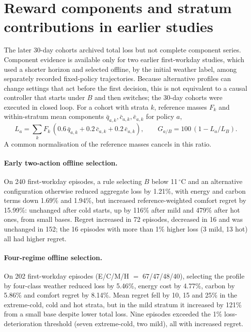 \section{Reward components and stratum contributions in earlier studies}\label{app:components}
The later 30-day cohorts archived total loss but not complete component series. Component evidence is available only for
two earlier first-workday studies, which used a shorter horizon and selected offline, by the initial weather label, among
separately recorded fixed-policy trajectories. Because alternative profiles can change settings that act before the first
decision, this is not equivalent to a causal controller that starts under $B$ and then switches; the 30-day cohorts were
executed in closed loop. For a cohort with strata $k$, reference masses $F_k$ and within-stratum mean components
$\bar q_{a,k}, \bar c_{a,k}, \bar e_{a,k}$ for policy $a$,
\begin{equation}
  L_{a} = \sum_k F_k\,(0.6\,\bar q_{a,k} + 0.2\,\bar c_{a,k} + 0.2\,\bar e_{a,k}),
  \qquad G_{a/B} = 100\,(1 - L_a/L_B).
\end{equation}
A common normalisation of the reference masses cancels in this ratio.

\paragraph{Early two-action offline selection.}
On 240 first-workday episodes, a rule selecting $B$ below 11\,$^\circ$C and an alternative configuration otherwise
reduced aggregate loss by 1.21\%, with energy and carbon terms down 1.69\% and 1.94\%, but increased reference-weighted
comfort regret by 15.99\%: unchanged after cold starts, up by 116\% after mild and 479\% after hot ones, from small bases. Regret increased in 72 episodes, decreased in 16 and was unchanged in 152;
the 16 episodes with more than 1\% higher loss (3 mild, 13 hot) all had higher regret.

\paragraph{Four-regime offline selection.}
On 202 first-workday episodes (E/C/M/H $=$ 67/47/48/40), selecting the profile by four-class weather reduced loss by
5.46\%, energy cost by 4.77\%, carbon by 5.86\% and comfort regret by 8.14\%. Mean regret fell by 10, 15 and 25\% in the extreme-cold, cold and hot strata,
but in the mild stratum it increased by 121\% from a small base despite lower total loss. Nine episodes
exceeded the 1\% loss-deterioration threshold (seven extreme-cold, two mild), all with increased regret.

